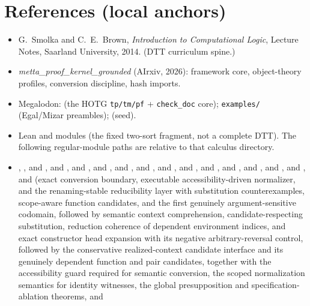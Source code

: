 \documentclass[11pt]{article}
\newcommand{\HOTG}{HOTG}
\newcommand{\DTT}{DTT}
\newcommand{\code}[1]{\texttt{#1}}
\begin{document}
\section*{References (local anchors)}
\begin{itemize}
\raggedright
\item G.\ Smolka and C.\ E.\ Brown, \emph{Introduction to Computational Logic},
  Lecture Notes, Saarland University, 2014. (DTT curriculum spine.)
\item \emph{metta\_proof\_kernel\_grounded} (AIrxiv, 2026): framework core,
  object-theory profiles, conversion discipline, hash imports.
\item Megalodon:  (the \HOTG{}
  \code{tp/tm/pf} + \code{check\_doc} core); \code{examples/} (Egal/Mizar
  preambles);  (seed).
\item Lean 
  and modules (the fixed two-sort fragment, not a complete \DTT{}).
  The following regular-module paths are relative to that calculus directory.
\item {},
  , and
  , and
  , and
  , and
  , and
  , and
  , and
  , and
  , and
  , and
  , and
  , and
  , and
  , and
   (exact conversion boundary, executable
  accessibility-driven normalizer, and the renaming-stable reducibility layer
  with substitution counterexamples, scope-aware function candidates, and the
  first genuinely argument-sensitive codomain, followed by semantic context
  comprehension, candidate-respecting substitution, reduction coherence of
  dependent environment indices, and exact constructor head expansion with its
  negative arbitrary-reversal control, followed by the conservative
  realized-context candidate interface and its genuinely dependent function
  and pair candidates, together with the accessibility guard required for
  semantic conversion, the scoped normalization semantics for identity
  witnesses, the global presupposition and specification-ablation theorems, and

\end{itemize}
\end{document}
